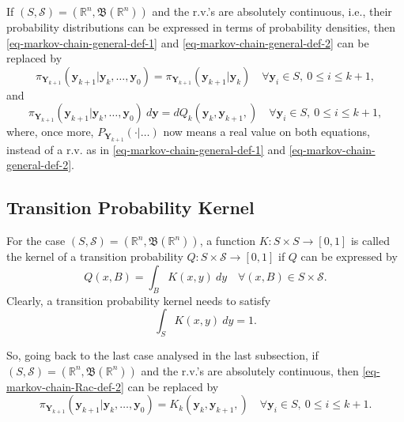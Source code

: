 If $(S,\mathcal{S})=(\mathbb{R}^n,\mathfrak{B}(\mathbb{R}^n))$ and
the r.v.'s are absolutely continuous, i.e., their probability distributions can be expressed in terms of probability densities,
then \eqref{eq-markov-chain-general-def-1} and \eqref{eq-markov-chain-general-def-2} can be replaced by
\begin{equation}\label{eq-markov-chain-Rac-def-1}
\pi_{\mathbf{Y}_{k+1}}(
\mathbf{y}_{k+1}
|
\mathbf{y}_k,
\ldots,
\mathbf{y}_0
)
=
\pi_{\mathbf{Y}_{k+1}}(
\mathbf{y}_{k+1}
|
\mathbf{y}_k
)
\quad\forall
\mathbf{y}_i\in S,~0\leqslant i\leqslant k+1,
\end{equation}
and
\begin{equation}\label{eq-markov-chain-Rac-def-2}
\pi_{\mathbf{Y}_{k+1}}(
\mathbf{y}_{k+1}
|
\mathbf{y}_k,
\ldots,
\mathbf{y}_0
)~d\mathbf{y}
=
dQ_k(
\mathbf{y}_k,
\mathbf{y}_{k+1},
)
\quad\forall
\mathbf{y}_i\in S,~0\leqslant i\leqslant k+1,
\end{equation}
where, once more,
$P_{\mathbf{Y}_{k+1}}(\cdot|\ldots)$ now means a real value on both equations,
instead of a r.v. as in \eqref{eq-markov-chain-general-def-1} and \eqref{eq-markov-chain-general-def-2}.

\subsection{Transition Probability Kernel}

For the case $(S,\mathcal{S})=(\mathbb{R}^n,\mathfrak{B}(\mathbb{R}^n))$,
a function $K:S\times S\rightarrow [0,1]$ is called the kernel of
a transition probability $Q:S\times\mathcal{S}\rightarrow [0,1]$
if $Q$ can be expressed by
\begin{equation*}
Q(x,B) = \int_B {K}(x,y)~dy \quad\forall (x,B)\in S\times\mathcal{S}.
\end{equation*}
Clearly, a transition probability kernel needs to satisfy
\begin{equation*}
\int_S {K}(x,y)~dy=1.
\end{equation*}

So, going back to the last case analysed in the last subsection,
if $(S,\mathcal{S})=(\mathbb{R}^n,\mathfrak{B}(\mathbb{R}^n))$ and
the r.v.'s are absolutely continuous,
then
\eqref{eq-markov-chain-Rac-def-2} can be replaced by
\begin{equation}\label{eq-markov-chain-Rac-def-3}
\pi_{\mathbf{Y}_{k+1}}(
\mathbf{y}_{k+1}
|
\mathbf{y}_k,
\ldots,
\mathbf{y}_0
)
=
K_k(
\mathbf{y}_k,
\mathbf{y}_{k+1},
)
\quad\forall
\mathbf{y}_i\in S,~0\leqslant i\leqslant k+1.
\end{equation}

